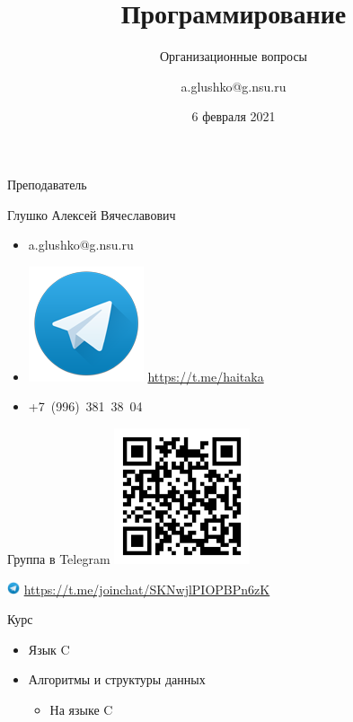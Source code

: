 \documentclass[aspectratio=169,14pt]{beamer}
\title{Программирование}
\subtitle{Организационные вопросы}
\author{a.glushko@g.nsu.ru}
\date{6 февраля 2021}
\begin{document}
    \begin{frame}
        \titlepage
    \end{frame}

    \begin{frame}{Преподаватель}
        \begin{block}{Глушко Алексей Вячеславович}
            \begin{itemize}
                \item a.glushko@g.nsu.ru
                \item \includegraphics[height=\fontcharht\font`\B]{media/telegram128} \url{https://t.me/haitaka} %
                \item +7~(996)~381~38~04
            \end{itemize}
        \end{block}
    \end{frame}

    \begin{frame}{Группа в Telegram}
        \includegraphics[width=4cm]{media/telegram-invite-qr}

        \includegraphics[height=1em]{media/telegram128} \url{https://t.me/joinchat/SKNwjlPIOPBPn6zK} %
    \end{frame}

    \begin{frame}{Курс}
        \begin{itemize}
            \item Язык C
            \item Алгоритмы и структуры данных
                \begin{itemize}
                    \item На языке C
                \end{itemize}
        \end{itemize}
    \end{frame}
\end{document}
